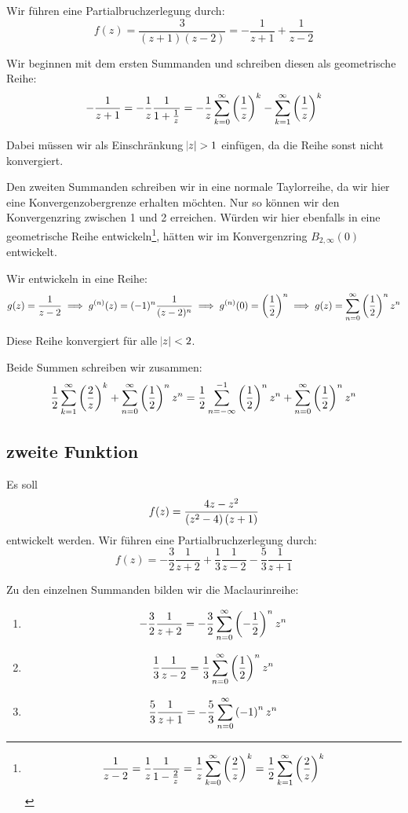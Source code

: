 Wir führen eine Partialbruchzerlegung durch:
\[
	f(z) = \frac3{(z+1)(z-2)} = -\frac1{z+1} + \frac1{z-2}
\]

Wir beginnen mit dem ersten Summanden und schreiben diesen als geometrische
Reihe:
\[
	-\frac1{z+1}
	=
	- \frac 1z \frac1{1+\frac 1z}
	=
	- \frac 1z \sum_{k=0}^\infty \del{\frac 1z}^k
	- \sum_{k=1}^\infty \del{\frac 1z}^k
\]

Dabei müssen wir als Einschränkung $\abs z > 1$ einfügen, da die Reihe sonst nicht konvergiert.

Den zweiten Summanden schreiben wir in eine normale Taylorreihe, da wir hier
eine Konvergenzobergrenze erhalten möchten. Nur so können wir den
Konvergenzring zwischen 1 und 2 erreichen. Würden wir hier ebenfalls in eine
geometrische Reihe entwickeln\footnote{
\[
	\frac1{z-2}
	=
	\frac 1z \frac1{1-\frac2z}
	=
	\frac 1z \sum_{k=0}^\infty \del{\frac2z}^k
	=
	\frac 12 \sum_{k=1}^\infty \del{\frac2z}^{k}
\]
}, hätten wir im Konvergenzring $B_{2, \infty}(0)$ entwickelt.

Wir entwickeln in eine Reihe:
\[
	g(z) = \frac{1}{z-2}
	\implies
	g^{(n)}(z) = (-1)^n \frac{1}{(z-2)^n}
	\implies
	g^{(n)}(0) = \del{\half}^n
	\implies
	g(z) = \sum_{n=0}^\infty \del{\half}^n z^n
\]

Diese Reihe konvergiert für alle $\abs z < 2$.

Beide Summen schreiben wir zusammen:
\[
	\frac 12 \sum_{k=1}^\infty \del{\frac2z}^{k}
	+ \sum_{n=0}^\infty \del{\half}^n z^n
	=
	\frac 12 \sum_{n=-\infty}^{-1} \del{\half}^{n} z^n
	+ \sum_{n=0}^\infty \del{\half}^n z^n
\]

\subsection{zweite Funktion}

Es soll
\[
	f(z) = \frac{4z-z^2}{\del{z^2-4}\del{z+1}}
\]
entwickelt werden. Wir führen eine Partialbruchzerlegung durch:
\[
	f(z) = - \frac32\frac1{z+2} + \frac13\frac1{z-2} - \frac53\frac1{z+1}
\]

Zu den einzelnen Summanden bilden wir die Maclaurinreihe:
\begin{enumerate}
	\item
		\[
			- \frac32\frac1{z+2}
			= - \frac 32 \sum_{n=0}^\infty \del{-\frac 12}^n z^n
		\]

	\item
		\[
			\frac13\frac1{z-2}
			= \frac 13 \sum_{n=0}^\infty \del{\frac 12}^n z^n
		\]

	\item
		\[
			\frac53\frac1{z+1}
			= - \frac 53 \sum_{n=0}^\infty \del{-1}^n z^n
		\]
\end{enumerate}

